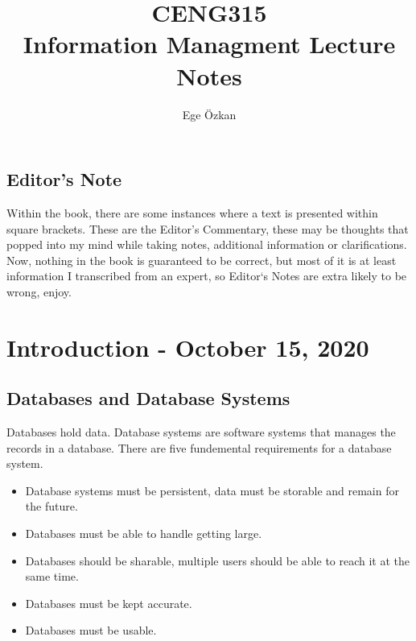\documentclass[11pt,a4paper,twocolumn]{book}
\author{Ege Özkan}
\title{CENG315 \\ \large{Information Managment Lecture Notes}}
\begin{document}
\lstset{language=SQL}
\newcommand{\missing}{\textit{(!*)}}
\newcommand{\unsure}{\textit{?*}}
\newcommand{\code}[1]{\texttt{#1}}
\newcommand{\set}[1]{\ensuremath{\{ #1 \}}}
\newcommand{\join}{\ensuremath{\bowtie}}
\newcommand{\fd}[2]{$ \code{#1} \to \code{#2} $}
\newcommand{\assign}{\ensuremath{\leftarrow}}
\maketitle

\frontmatter

\tableofcontents

\section*{Editor's Note}

Within the book, there are some instances where a text is presented within square brackets. These are the Editor's Commentary, these may be thoughts that popped into my mind while taking notes, additional information or clarifications. Now, nothing in the book is guaranteed to be correct, but most of it is at least information I transcribed from an expert, so Editor`s Notes are extra likely to be wrong, enjoy.

\mainmatter
\chapter{Introduction - October 15, 2020}

\section{Databases and Database Systems}

Databases hold data. Database systems are software systems that manages the records in a database. There are five fundemental requirements for a database system.

\begin{itemize}
\item Database systems must be persistent, data must be storable and remain for the future.
\item Databases must be able to handle getting large.
\item Databases should be sharable, multiple users should be able to reach it at the same time.
\item Databases must be kept accurate.
\item Databases must be usable.
\end{itemize}
\end{document}
